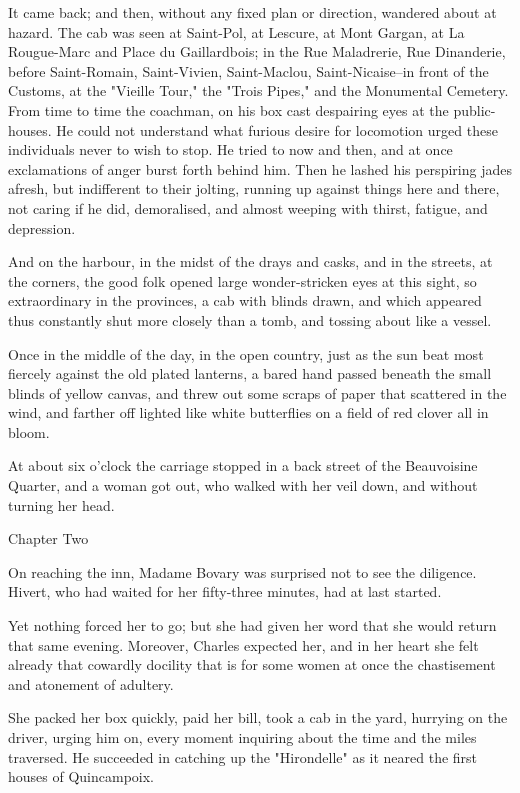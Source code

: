 \documentclass[11pt,twocolumn]{ltugboat}
\begin{document}
It came back; and then, without any fixed plan or direction, wandered
about at hazard. The cab was seen at Saint-Pol, at Lescure, at Mont
Gargan, at La Rougue-Marc and Place du Gaillardbois; in the Rue
Maladrerie, Rue Dinanderie, before Saint-Romain, Saint-Vivien,
Saint-Maclou, Saint-Nicaise--in front of the Customs, at the "Vieille
Tour," the "Trois Pipes," and the Monumental Cemetery. From time to time
the coachman, on his box cast despairing eyes at the public-houses.
He could not understand what furious desire for locomotion urged these
individuals never to wish to stop. He tried to now and then, and at
once exclamations of anger burst forth behind him. Then he lashed his
perspiring jades afresh, but indifferent to their jolting, running up
against things here and there, not caring if he did, demoralised, and
almost weeping with thirst, fatigue, and depression.

And on the harbour, in the midst of the drays and casks, and in the
streets, at the corners, the good folk opened large wonder-stricken
eyes at this sight, so extraordinary in the provinces, a cab with blinds
drawn, and which appeared thus constantly shut more closely than a tomb,
and tossing about like a vessel.

Once in the middle of the day, in the open country, just as the sun
beat most fiercely against the old plated lanterns, a bared hand passed
beneath the small blinds of yellow canvas, and threw out some scraps
of paper that scattered in the wind, and farther off lighted like white
butterflies on a field of red clover all in bloom.

At about six o'clock the carriage stopped in a back street of the
Beauvoisine Quarter, and a woman got out, who walked with her veil down,
and without turning her head.



Chapter Two

On reaching the inn, Madame Bovary was surprised not to see the
diligence. Hivert, who had waited for her fifty-three minutes, had at
last started.

Yet nothing forced her to go; but she had given her word that she would
return that same evening. Moreover, Charles expected her, and in her
heart she felt already that cowardly docility that is for some women at
once the chastisement and atonement of adultery.

She packed her box quickly, paid her bill, took a cab in the yard,
hurrying on the driver, urging him on, every moment inquiring about
the time and the miles traversed. He succeeded in catching up the
"Hirondelle" as it neared the first houses of Quincampoix.
\end{document}
